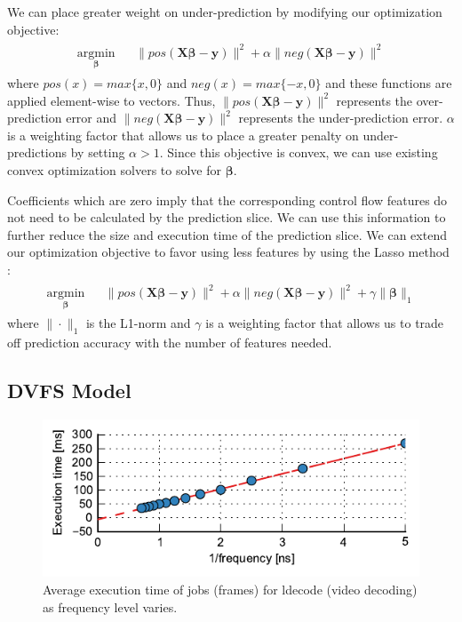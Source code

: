 We can place greater weight on under-prediction by modifying our optimization
objective:
\begin{align*}
\begin{aligned}
  \underset{\boldsymbol{\beta}}{\text{argmin}} & & \|pos(\textbf{X}\boldsymbol{\beta} - \textbf{y})\|^2 + \alpha \|neg(\textbf{X}\boldsymbol{\beta} - \textbf{y})\|^2
\end{aligned}
\end{align*}
where $pos(x) = max\{x, 0\}$ and $neg(x) = max\{-x, 0\}$ and these functions
are applied element-wise to vectors. Thus, $\|pos(\textbf{X}\boldsymbol{\beta}
- \textbf{y})\|^2$ represents the over-prediction error and
$\|neg(\textbf{X}\boldsymbol{\beta} - \textbf{y})\|^2$ represents the
under-prediction error. $\alpha$ is a weighting factor that allows us to place
a greater penalty on under-predictions by setting $\alpha > 1$.  Since this
objective is convex, we can use existing convex optimization solvers to solve
for $\boldsymbol{\beta}$.

Coefficients which are zero imply that the corresponding control flow features
do not need to be calculated by the prediction slice. We can use this
information to further reduce the size and execution time of the prediction
slice. We can extend our optimization objective to favor using less features by
using the Lasso method \cite{lasso-jrss96}:
\begin{align*}
\begin{aligned}
  \underset{\boldsymbol{\beta}}{\text{argmin}} & & \|pos(\textbf{X}\boldsymbol{\beta} - \textbf{y})\|^2 + \alpha \|neg(\textbf{X}\boldsymbol{\beta} - \textbf{y})\|^2 + \gamma \|\boldsymbol{\beta}\|_1
\end{aligned}
\end{align*}
where $\|\cdot\|_1$ is the L1-norm and $\gamma$ is a weighting factor that
allows us to trade off prediction accuracy with the number of features needed.

\subsection{DVFS Model}
\label{sec:exec_time_prediction.prediction.dvfs}

\begin{figure}
  \begin{center}
    \includegraphics{exec_time_prediction/figs/dvfs_linearity.pdf}
    \caption{Average execution time of jobs (frames) for ldecode (video
    decoding) as frequency level varies.}
    \label{fig:exec_time_prediction.prediction.dvfs_linearity}
  \end{center}
\end{figure}


